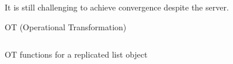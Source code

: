 
\begin{frame}{}
  \centerline{}
\end{frame}

\begin{frame}{}
  \centerline{It is still challenging to achieve convergence despite the server.}
  
\end{frame}

\begin{frame}{}
  \centerline{OT (Operational Transformation)}

  \begin{columns}
      \begin{center}
	
      \end{center}
      \begin{center}
	
      \end{center}
  \end{columns}
\end{frame}

\begin{frame}{}
  \centerline{\large OT functions for a replicated list object~}

  \resizebox{\textwidth}{!}{
    \begin{minipage}{\textwidth}
      
    \end{minipage}
  }
\end{frame}

